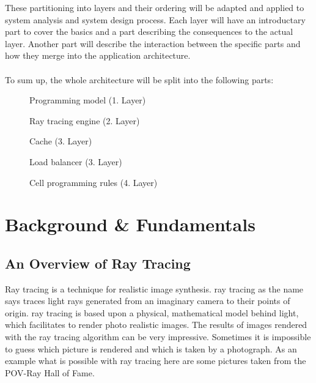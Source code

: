\documentclass[DIV10, abstracton, openright, footsepline, headsepline, twoside, 9pt,
bigheadings]{scrreprt}
\begin{document}
These partitioning into layers and their ordering will be adapted and applied to
system analysis and system design process. Each layer will have an introductary
part to cover the basics and a part describing the consequences to the actual
layer. Another part will describe the interaction between the specific parts and
how they merge into the application architecture.\\\\
To sum up, the whole architecture will be split into the following
parts:
\begin{description}
\item[\color{Bigblue}{\color{Bigblue}{$\triangleright$}}] Programming model (1. Layer)
\item[\color{Bigblue}{$\triangleright$}] Ray tracing engine (2. Layer)
\item[\color{Bigblue}{$\triangleright$}] Cache (3. Layer)
\item[\color{Bigblue}{$\triangleright$}] Load balancer (3. Layer)
\item[\color{Bigblue}{$\triangleright$}] Cell programming rules (4. Layer)
\end{description}

\chapter{Background \& Fundamentals}
\section{An Overview of Ray Tracing}
Ray tracing is a technique for realistic image synthesis. ray tracing as
the name says traces light rays generated from an imaginary camera to their
points of origin. ray tracing is based upon a physical, mathematical model
behind light, which facilitates to render photo realistic images. The results of
images rendered with the ray tracing algorithm can be very impressive. Sometimes
it is impossible to guess which picture is rendered and which is taken by a
photograph. As an example what is possible with ray tracing here are some
pictures taken from the POV-Ray Hall of Fame.
\end{document}
